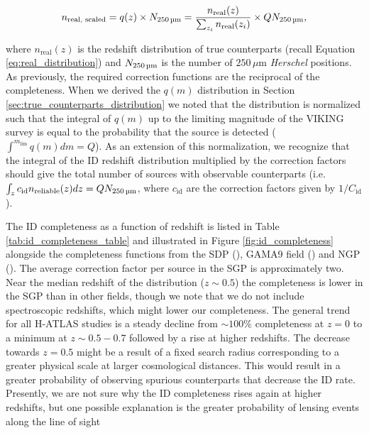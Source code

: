 \begin{equation}
    n_{\textrm{real, scaled}} = q(z)\times N_{\textrm{250\,\micron}} = \frac{n_{\textrm{real}}(z)}{\sum_{z_i}n_{\textrm{real}}(z_i)}\times QN_{\textrm{250\,\micron}},
    \label{eq:n_real_scaled}
\end{equation}

\noindent where $n_{\textrm{real}}(z)$ is the redshift distribution of true counterparts (recall Equation \ref{eq:real_distribution}) and $N_{\textrm{250\,\micron}}$ is the number of $250\,\mu$m \textit{Herschel} positions. As previously, the required correction functions are the reciprocal of the completeness. When we derived the $q(m)$ distribution in Section \ref{sec:true_counterparts_distribution} we noted that the distribution is normalized such that the integral of $q(m)$ up to the limiting magnitude of the VIKING survey is equal to the probability that the source is detected ($\int^{m_\textrm{lim}} q(m) dm = Q$). As an extension of this normalization, we recognize that the integral of the ID redshift distribution multiplied by the correction factors should give the total number of sources with observable counterparts (i.e. $\int_z c_{\textrm{id}} n_{\textrm{reliable}}(z) dz = QN_{\textrm{250\,\micron}}$, where $c_{\textrm{id}}$ are the correction factors given by $1/C_{\textrm{id}}$).

The ID completeness as a function of redshift is listed in Table \ref{tab:id_completeness_table} and illustrated in Figure \ref{fig:id_completeness} alongside the completeness functions from the SDP (\citealt{Smith_2011}), GAMA9 field (\citealt{Fleuren_2012}) and NGP (\citealt{Bourne_2016}). The average correction factor per source in the SGP is approximately two. Near the median redshift of the distribution ($z \sim 0.5$) the completeness is lower in the SGP than in other fields, though we note that we do not include spectroscopic redshifts, which might lower our completeness. The general trend for all H-ATLAS studies is a steady decline from $\sim 100\%$ completeness at $z = 0$ to a minimum at $z \sim 0.5 - 0.7$ followed by a rise at higher redshifts. The decrease towards $z = 0.5$ might be a result of a fixed search radius corresponding to a greater physical scale at larger cosmological distances. This would result in a greater probability of observing spurious counterparts that decrease the ID rate. Presently, we are not sure why the ID completeness rises again at higher redshifts, but one possible explanation is the greater probability of lensing events along the line of sight 

